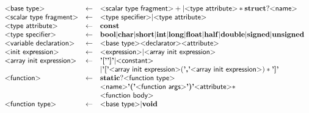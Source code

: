 \begin{figure}
\[\begin{array}{lcl}
  \text{\sf\textless base type\textgreater} & \gets & \text{\sf\textless scalar type fragment\textgreater}+
                               | \text{\sf\textless type attribute\textgreater}* \mathbf{struct}? \text{\sf\textless name\textgreater}\\


  \text{\sf\textless scalar type fragment\textgreater} & \gets & \text{\sf\textless type specifier\textgreater} | \text{\sf\textless type attribute\textgreater} \\

  \text{\sf\textless type attribute\textgreater} & \gets & \mathbf{const} \\

  \text{\sf\textless type specifier\textgreater} & \gets & \mathbf{bool}
                                    | \mathbf{char}
                                    | \mathbf{short}
                                    | \mathbf{int}
                                    | \mathbf{long}
                                    | \mathbf{float}
                                    | \mathbf{half}
                                    | \mathbf{double}
                                    | \mathbf{signed}
                                    | \mathbf{unsigned}
  \\

  \text{\sf\textless variable declaration\textgreater} & \gets & \text{\sf\textless base type\textgreater} \text{\sf\textless declarator\textgreater} \text{\sf\textless attribute\textgreater}
  \\

  \text{\sf\textless init expression\textgreater} & \gets & \text{\sf\textless expression\textgreater} | \text{\sf\textless array init expression\textgreater} \\

  \text{\sf\textless array init expression\textgreater} & \gets & \text{\bf'['}\text{\bf']'}
                                           |\text{\sf\textless constant\textgreater}\\
  & &                                      | \text{\bf'['} \text{\sf\textless array init expression\textgreater}
                                                        (\text{\bf','} \text{\sf\textless array init expression\textgreater})*
                                             \text{\bf']'}
  \\
  \text{\sf\textless function\textgreater} & \gets & \mathbf{static}? \text{\sf\textless function type\textgreater} \\
                                & & \text{\sf\textless name\textgreater}
                                \text{\bf'('} \text{\sf\textless function args\textgreater} \text{\bf')'} \text{\sf\textless attribute\textgreater}*\\
                                & & \text{\sf\textless function body\textgreater}
  \\
  \text{\sf\textless function type\textgreater} & \gets & \text{\sf\textless base type\textgreater} | \mathbf{void} \\


\end{array}\]
\end{figure}
